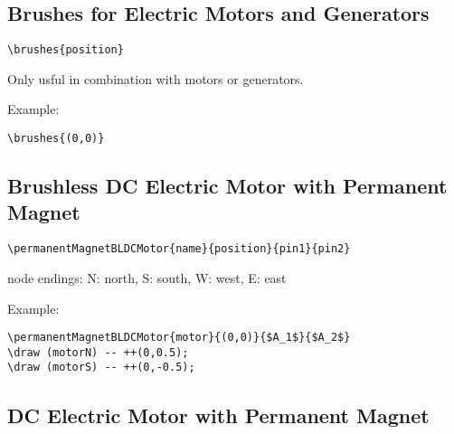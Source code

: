 \documentclass[parskip=full]{scrartcl}
\begin{document}
\subsection{Brushes for Electric Motors and Generators}

\begin{verbatim}
\brushes{position}
\end{verbatim}
Only usful in combination with motors or generators.

Example:\\
\begin{minipage}{0.8\textwidth}
\begin{verbatim}
\brushes{(0,0)}
\end{verbatim}
\end{minipage}
\begin{minipage}{0.19\textwidth}
\end{minipage}

\subsection{Brushless DC Electric Motor with Permanent Magnet}

\begin{verbatim}
\permanentMagnetBLDCMotor{name}{position}{pin1}{pin2}
\end{verbatim}
node endings: N: north, S: south, W: west, E: east

Example:\\
\begin{minipage}{0.8\textwidth}
\begin{verbatim}
\permanentMagnetBLDCMotor{motor}{(0,0)}{$A_1$}{$A_2$}
\draw (motorN) -- ++(0,0.5);
\draw (motorS) -- ++(0,-0.5);
\end{verbatim}
\end{minipage}
\begin{minipage}{0.19\textwidth}
\end{minipage}

\subsection{DC Electric Motor with Permanent Magnet}
\end{document}
